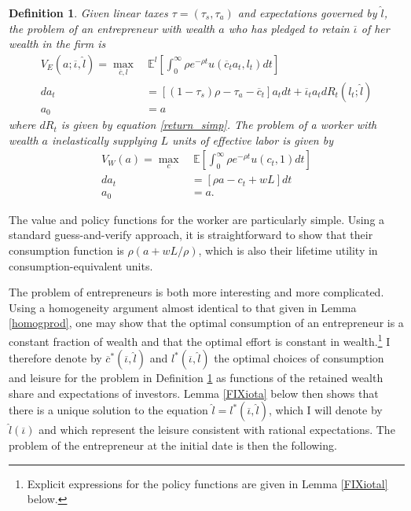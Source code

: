 \documentclass[11pt]{article}
\theoremstyle{plain}
\newtheorem{defn}{Definition}[section]
\begin{document}
\begin{defn}  \label{conPROBlin2}
Given linear taxes $\tau = (\tau_s,\tau_a)$ and expectations governed by $\hat{l}$, the problem of an entrepreneur with wealth $a$ who has pledged to retain $\overline{\iota}$ of her wealth in the firm is
\begin{align*}
V_E(a; \overline{\iota}, \hat{l}) = \max_{\overline{c},l} & \ \mathbb{E}^l{\left[\int_{0}^{\infty}\rho e^{-\rho t}u(\overline{c}_ta_t,l_t)dt\right]}
\\ da_t & = [(1-\tau_s)\rho - \tau_a - \overline{c}_t]a_tdt + \overline{\iota}_t a_tdR_t(l_t;\hat{l})
\\ a_0 & = a
\end{align*}
where $dR_t$ is given by equation \eqref{return_simp}. The problem of a worker with wealth $a$ inelastically supplying $L$ units of effective labor is given by
\begin{align*}
V_W(a) = \max_{c} & \ \mathbb{E}{\left[\int_{0}^{\infty}\rho e^{-\rho t}u(c_t, 1)dt\right]}
\\ da_t & = [\rho a - c_t + wL]dt
\\ a_0 & = a.
\end{align*}
\end{defn}

The value and policy functions for the worker are particularly simple. Using a standard guess-and-verify approach, it is straightforward to show that their consumption function is $\rho (a+wL/\rho)$, which is also their lifetime utility in consumption-equivalent units. 

The problem of entrepreneurs is both more interesting and more complicated. Using a homogeneity argument almost identical to that given in Lemma \ref{homogprod}, one may show that the optimal consumption of an entrepreneur is a constant fraction of wealth and that the optimal effort is constant in wealth.\footnote{Explicit expressions for the policy functions are given in Lemma \ref{FIXiotal} below.} I therefore denote by $\overline{c}^*(\overline{\iota}, \hat{l})$ and $l^*(\overline{\iota}, \hat{l})$ the optimal choices of consumption and leisure for the problem in Definition \ref{conPROBlin2} as functions of the retained wealth share and expectations of investors. Lemma \ref{FIXiota} below then shows that there is a unique solution to the equation $\hat{l} = l^*(\overline{\iota}, \hat{l})$, which I will denote by $\hat{l}(\overline{\iota})$ and which represent the leisure consistent with rational expectations. The problem of the entrepreneur at the initial date is then the following. 
\end{document}
